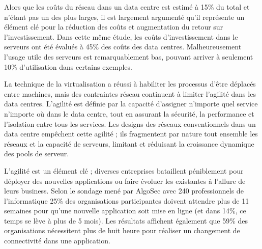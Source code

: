 \par
Alors que les coûts du réseau dans un data centre est estimé à 15\% \cite{cloudCosts} du total et n'étant pas un des plus larges, il est largement argumenté qu'il représente un élément clé pour la réduction des coûts et augmentation du retour sur l'investissement. Dans cette même étude, les coûts d'investissement dans le serveurs ont été évalués à 45\% des coûts des data centres. Malheureusement l'usage utile des serveurs est remarquablement bas, pouvant arriver à seulement 10\% d'utilisation dans certains exemples.

\par 
La technique de la virtualisation a réussi à habiliter les processus d'être déplacés entre machines, mais des contraintes réseau continuent à limiter l'agilité dans les data centres. L'agilité est définie par la capacité d'assigner n'importe quel service n'importe où dans le data centre, tout en assurant la sécurité, la performance et l'isolation entre tous les services. Les designs des réseaux conventionnels dans un data centre empêchent cette agilité ; ils fragmentent par nature tout ensemble les réseaux et la capacité de serveurs, limitant et réduisant la croissance dynamique des pools de serveur. \cite{cloudCostsAgility}



\par 
L'agilité est un élément clé ; diverses entreprises bataillent péniblement pour déployer des nouvelles applications ou faire évoluer les existantes à l'allure de leurs business. Selon le sondage mené par AlgoSec avec 240 professionnels de l'informatique 25\% des organisations participantes doivent attendre plus de 11 semaines pour qu'une nouvelle application soit mise en ligne (et dans 14\%, ce temps se lève à plus de 5 mois). Les résultats affichent également que 59\% des organisations nécessitent plus de huit heure pour réaliser un changement de connectivité dans une application. \cite{algoSecSurvey}


